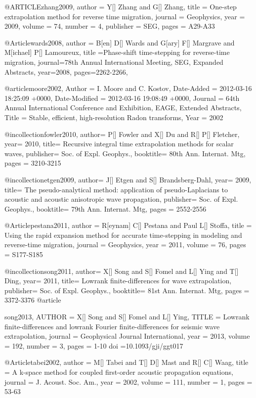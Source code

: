 @ARTICLE{zhang2009,
  author = {Y[] Zhang and G[] Zhang},
  title = {One-step extrapolation method for reverse time migration},
  journal = {Geophysics},
  year = {2009},
  volume = {74},
  number = {4},
  publisher = {SEG},
  pages = {A29-A33}
}

@Article{wards2008,
  author = {B[en] D[] Wards and G[ary] F[] Margrave and M[ichael] P[] Lamoureux},
  title ={Phase-shift time-stepping for reverse-time migration},
  journal={78th Annual International Meeting, SEG, Expanded Abstracts},
  year=2008,
  pages={2262-2266},
}

@article{moore2002,
	Author = {I. Moore and C. Kostov},
	Date-Added = {2012-03-16 18:25:09 +0000},
	Date-Modified = {2012-03-16 19:08:49 +0000},
	Journal = {64th Annual International Conference and Exhibition, EAGE, Extended Abstracts},
	Title = {Stable, efficient, high-resolution {R}adon transforms},
	Year = {2002}}

@incollection{fowler2010,
	author=	{P[] Fowler and X[] Du and R[] P[] Fletcher},
	year=	2010,
	title=	{Recursive integral time extrapolation methods 
for scalar waves},
	publisher=	{Soc. of Expl. Geophys.},
	booktitle=	{80th Ann. Internat. Mtg},
        pages = {3210-3215}
	}



@incollection{etgen2009,
	author=	{J[] Etgen and S[] Brandsberg-Dahl},
	year=	2009,
	title=	{The pseudo-analytical method: application of {pseudo-Laplacians} to acoustic and acoustic anisotropic wave propagation},
	publisher=	{Soc. of Expl. Geophys.},
	booktitle=	{79th Ann. Internat. Mtg},
        pages = {2552-2556}
	}

@Article{pestana2011,
  author = 	 {R[eynam] C[] Pestana and Paul L[] Stoffa},
  title = 	 {Using the rapid expansion method for accurate time-stepping in modeling and reverse-time migration},
  journal = 	 {Geophysics},
  year = 	 2011,
  volume = 	 76,
  pages = 	 {S177-S185}}

@incollection{song2011,
	author=	{X[] Song and S[] Fomel and L[] Ying and T[] Ding},
	year=	2011,
	title=	{Lowrank finite-differences for wave extrapolation},
	publisher=	{Soc. of Expl. Geophys.},
	booktitle=	{81st Ann. Internat. Mtg},
        pages = {3372-3376}
	}
@article{song2013,
  AUTHOR = {X[] Song and S[] Fomel and L[] Ying},
  TITLE = {Lowrank finite-differences and lowrank {F}ourier finite-differences for seismic wave extrapolation},
  journal = {Geophysical Journal International},
  year = 	 {2013},
  volume =       192,
  number = {3},
  pages = {1-10}
  doi =10.1093/gji/ggt017

}
@Article{tabei2002,
  author =       {M[] Tabei and T[] D[] Mast and R[] C[] Waag},
  title =     {A k-space method for coupled first-order acoustic propagation equations}, 
  journal = {J. Acoust. Soc. Am.},
  year =         2002,
  volume =       111,
  number =       1,
  pages =        {53-63}
}

